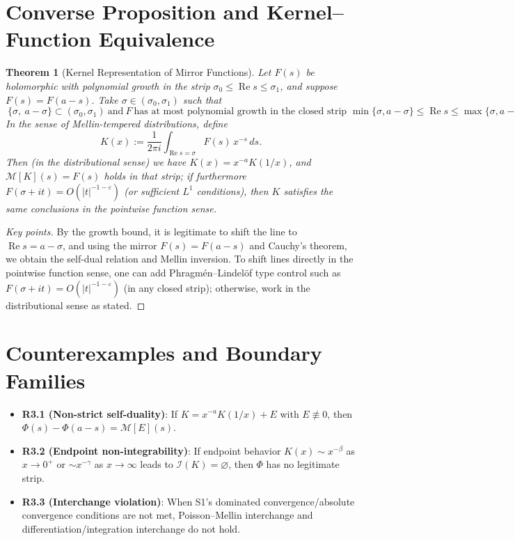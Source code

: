 \documentclass[11pt,a4paper]{article}
\newtheorem{theorem}{Theorem}[section]
\theoremstyle{remark}
\DeclareMathOperator{\Re}{Re}
\begin{document}
\section{Converse Proposition and Kernel--Function Equivalence}

\begin{theorem}[Kernel Representation of Mirror Functions]\label{thm:converse}
Let $F(s)$ be holomorphic with polynomial growth in the strip $\sigma_0\le\Re s\le\sigma_1$, and suppose $F(s)=F(a-s)$. Take $\sigma\in(\sigma_0,\sigma_1)$ such that
\begin{equation}
\boxed{\ \{\sigma,\ a-\sigma\}\subset(\sigma_0,\sigma_1)\ \text{and}\ F\ \text{has at most polynomial growth in the closed strip } \min\{\sigma,a-\sigma\}\le \Re s\le \max\{\sigma,a-\sigma\}\ }
\end{equation}
In the sense of Mellin-tempered distributions, define
\begin{equation}
K(x):=\frac{1}{2\pi i}\int_{\Re s=\sigma} F(s)\,x^{-s}\,ds.
\end{equation}
Then (in the distributional sense) we have $K(x)=x^{-a}K(1/x)$, and $\mathcal{M}[K](s)=F(s)$ holds in that strip; if furthermore $F(\sigma+it)=O(|t|^{-1-\varepsilon})$ (or sufficient $L^1$ conditions), then $K$ satisfies the same conclusions in the pointwise function sense.
\end{theorem}

\begin{proof}[Key points]
By the growth bound, it is legitimate to shift the line to $\Re s=a-\sigma$, and using the mirror $F(s)=F(a-s)$ and Cauchy's theorem, we obtain the self-dual relation and Mellin inversion. To shift lines directly in the pointwise function sense, one can add Phragm\'en--Lindel\"of type control such as $F(\sigma+it)=O(|t|^{-1-\varepsilon})$ (in any closed strip); otherwise, work in the distributional sense as stated.
\end{proof}

\section{Counterexamples and Boundary Families}

\begin{itemize}
\item \textbf{R3.1 (Non-strict self-duality)}: If $K=x^{-a}K(1/x)+E$ with $E\not\equiv0$, then $\Phi(s)-\Phi(a-s)=\mathcal{M}[E](s)$.

\item \textbf{R3.2 (Endpoint non-integrability)}: If endpoint behavior $K(x)\sim x^{-\beta}$ as $x\to0^+$ or $\sim x^{-\gamma}$ as $x\to\infty$ leads to $\mathcal{I}(K)=\varnothing$, then $\Phi$ has no legitimate strip.

\item \textbf{R3.3 (Interchange violation)}: When S1's dominated convergence/absolute convergence conditions are not met, Poisson--Mellin interchange and differentiation/integration interchange do not hold.
\end{itemize}
\end{document}

